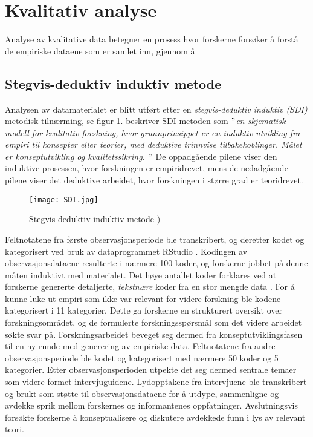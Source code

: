 \section{Kvalitativ analyse}
\label{section:kvalitativ_analyse} 

Analyse av kvalitative data betegner en prosess hvor forskerne forsøker å forstå de empiriske dataene som er samlet inn, gjennom å 


\subsection{Stegvis-deduktiv induktiv metode}
Analysen av datamaterialet er blitt utført etter en \textit{stegvis-deduktiv induktiv (SDI)} metodisk tilnærming, se figur \ref{SDI}. \citet{Tjora} beskriver SDI-metoden som \textit{$"$en skjematisk modell for kvalitativ forskning, hvor grunnprinsippet er en induktiv utvikling fra empiri til konsepter eller teorier, med deduktive trinnvise tilbakekoblinger. Målet er konseptutvikling og kvalitetssikring. $"$} De oppadgående pilene viser den induktive prosessen, hvor forskningen er empiridrevet, mens de nedadgående pilene viser det deduktive arbeidet, hvor forskningen i større grad er teoridrevet.

\begin{figure}[H]
\centering
\texttt{[image: SDI.jpg]}
\caption{Stegvis-deduktiv induktiv metode \citep{Tjora})}
\label{SDI}
\end{figure}

\noindent
Feltnotatene fra første observasjonsperiode ble transkribert, og deretter kodet og kategorisert ved bruk av dataprogrammet RStudio \citep{Rstudio}. Kodingen av observasjonsdataene resulterte i nærmere 100 koder, og forskerne jobbet på denne måten induktivt med materialet. Det høye antallet koder forklares ved at forskerne genererte detaljerte, \textit{tekstnære} koder fra en stor mengde data \citep{Tjora}. For å kunne luke ut empiri som ikke var relevant for videre forskning ble kodene kategorisert i 11 kategorier. Dette ga forskerne en strukturert oversikt over forskningsområdet, og de formulerte forskningsspørsmål som det videre arbeidet søkte svar på. Forskningsarbeidet beveget seg dermed fra konseptutviklingsfasen til en ny runde med generering av empiriske data. Feltnotatene fra andre observasjonsperiode ble kodet og kategorisert med nærmere 50 koder og 5 kategorier. Etter observasjonsperioden utpekte det seg dermed sentrale temaer som videre formet intervjuguidene. Lydopptakene fra intervjuene ble transkribert og brukt som støtte til observasjonsdataene for å utdype, sammenligne og avdekke sprik mellom forskernes og informantenes oppfatninger. Avslutningsvis forsøkte forskerne å konseptualisere og diskutere avdekkede funn i lys av relevant teori. 

